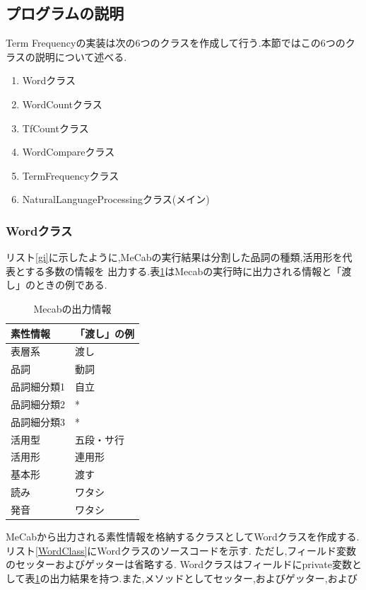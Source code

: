 \documentclass[a4j]{jarticle}
\begin{document}
\subsection{プログラムの説明}
Term Frequencyの実装は次の6つのクラスを作成して行う.本節ではこの6つのクラスの説明について述べる.
\begin{enumerate}
  \item Wordクラス
  \item WordCountクラス
  \item TfCountクラス
  \item WordCompareクラス
  \item TermFrequencyクラス
  \item NaturalLanguageProcessingクラス(メイン)
\end{enumerate}

\subsubsection{Wordクラス}
リスト\ref{gi}に示したように,MeCabの実行結果は分割した品詞の種類,活用形を代表とする多数の情報を
出力する.表\ref{mecabout}はMecabの実行時に出力される情報と「渡し」のときの例である.
\begin{table}[H]
  \caption{Mecabの出力情報}
  \label{mecabout}
  \begin{center}
      \begin{tabular}{l|l}\hline
        素性情報 & 「渡し」の例 \\ \hline
        \hline
        表層系 & 渡し \\
        品詞 & 動詞 \\
        品詞細分類1 & 自立 \\ 
        品詞細分類2 & * \\ 
        品詞細分類3 & * \\ 
        活用型 & 五段・サ行\\
        活用形 & 連用形 \\
        基本形 & 渡す \\
        読み & ワタシ \\
        発音 & ワタシ \\ \hline
      \end{tabular}
  \end{center}
  \end{table}
  MeCabから出力される素性情報を格納するクラスとしてWordクラスを作成する.リスト\ref{WordClass}にWordクラスのソースコードを示す.
  ただし,フィールド変数のセッターおよびゲッターは省略する.
  Wordクラスはフィールドにprivate変数として表\ref{mecabout}の出力結果を持つ.また,メソッドとしてセッター,およびゲッター,および
\end{document}
